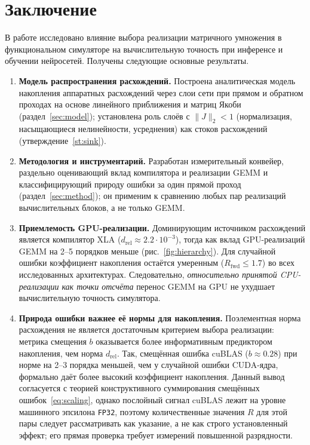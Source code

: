 \section{Заключение}
\label{sec:conclusion}

В работе исследовано влияние выбора реализации матричного умножения в
функциональном симуляторе на вычислительную точность при инференсе и обучении
нейросетей. Получены следующие основные результаты.

\begin{enumerate}\setlength\itemsep{2pt}
    \item \textbf{Модель распространения расхождений.} Построена аналитическая
        модель накопления аппаратных расхождений через слои сети при прямом и
        обратном проходах на основе линейного приближения и матриц Якоби
        (раздел~\ref{sec:model}); установлена роль слоёв с $\|J\|_2<1$
        (нормализация, насыщающиеся нелинейности, усреднения) как стоков
        расхождений (утверждение~\ref{st:sink}).
    \item \textbf{Методология и инструментарий.} Разработан измерительный
        конвейер, раздельно оценивающий вклад компилятора и реализации GEMM и
        классифицирующий природу ошибки за один прямой проход
        (раздел~\ref{sec:method}); он применим к сравнению любых пар реализаций
        вычислительных блоков, а не только GEMM.
    \item \textbf{Приемлемость GPU-реализации.} Доминирующим источником
        расхождений является компилятор XLA
        ($d_{\text{rel}}\approx2.2\cdot10^{-3}$), тогда как вклад GPU-реализаций
        GEMM на 2--5 порядков меньше (рис.~\ref{fig:hierarchy}). Для случайной
        ошибки коэффициент накопления остаётся умеренным ($R_{\text{fwd}}\le1.7$)
        во всех исследованных архитектурах. Следовательно, \emph{относительно
            принятой CPU-реализации как точки отсчёта} перенос GEMM на GPU не ухудшает
        вычислительную точность симулятора.
    \item \textbf{Природа ошибки важнее её нормы для накопления.} Поэлементная
        норма расхождения не является достаточным критерием выбора реализации:
        метрика смещения $b$ оказывается более информативным предиктором
        накопления, чем норма $d_{\text{rel}}$. Так, смещённая ошибка cuBLAS
        ($b\approx0.28$) при норме на 2--3 порядка меньшей, чем у случайной
        ошибки CUDA-ядра, формально даёт более высокий коэффициент накопления.
        Данный вывод согласуется с теорией конструктивного суммирования смещённых
        ошибок~\eqref{eq:scaling}, однако послойный сигнал cuBLAS лежит на уровне
        машинного эпсилона \texttt{FP32}, поэтому количественные значения
        $R$ для этой пары следует рассматривать как указание, а не как строго
        установленный эффект; его прямая проверка требует измерений повышенной
        разрядности.
\end{enumerate}

